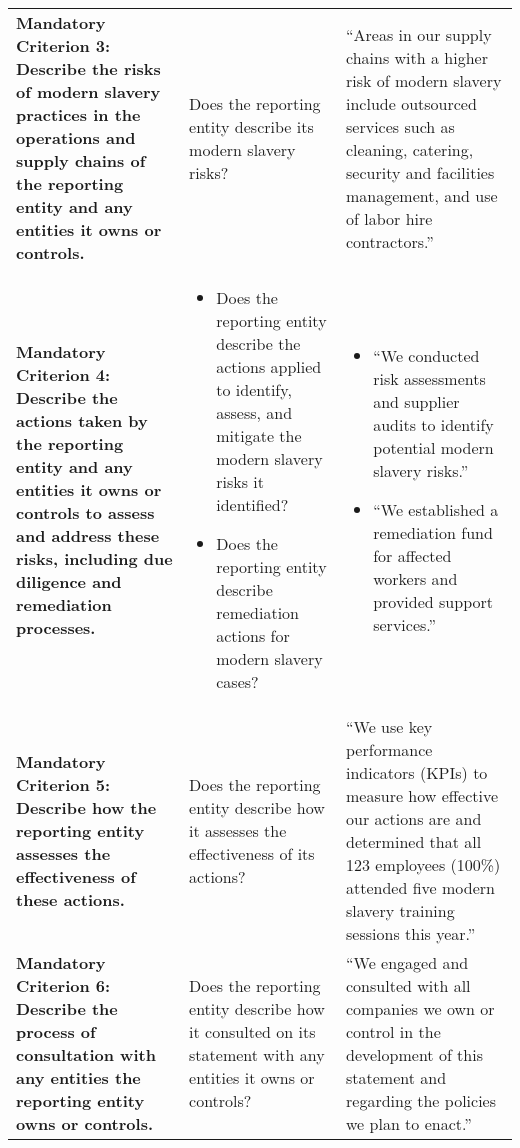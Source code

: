 \documentclass{article}
\begin{document}
\begin{table}[ht]
\begin{tabularx}{\textwidth}{@{}p{4.5cm}p{5cm}p{5cm}@{}}
\textbf{Mandatory Criterion 3: Describe the risks of modern slavery practices in the operations and supply chains of the reporting entity and any entities it owns or controls.} & 
Does the reporting entity describe its modern slavery risks? &
``Areas in our supply chains with a higher risk of modern slavery include outsourced services such as cleaning, catering, security and facilities management, and use of labor hire contractors.'' \\

\textbf{Mandatory Criterion 4: Describe the actions taken by the reporting entity and any entities it owns or controls to assess and address these risks, including due diligence and remediation processes.} & 
\begin{itemize}[leftmargin=*]
    \item Does the reporting entity describe the actions applied to identify, assess, and mitigate the modern slavery risks it identified?
    \item Does the reporting entity describe remediation actions for modern slavery cases?
\end{itemize} &
\begin{itemize}[leftmargin=*]
    \item ``We conducted risk assessments and supplier audits to identify potential modern slavery risks.''
    \item ``We established a remediation fund for affected workers and provided support services.''
\end{itemize} \\

\textbf{Mandatory Criterion 5: Describe how the reporting entity assesses the effectiveness of these actions.} & 
Does the reporting entity describe how it assesses the effectiveness of its actions? &
``We use key performance indicators (KPIs) to measure how effective our actions are and determined that all 123 employees (100\%) attended five modern slavery training sessions this year.'' \\

\textbf{Mandatory Criterion 6: Describe the process of consultation with any entities the reporting entity owns or controls.} & 
Does the reporting entity describe how it consulted on its statement with any entities it owns or controls? &
``We engaged and consulted with all companies we own or control in the development of this statement and regarding the policies we plan to enact.'' \\


\bottomrule
\end{tabularx}
\end{table}
\end{document}
